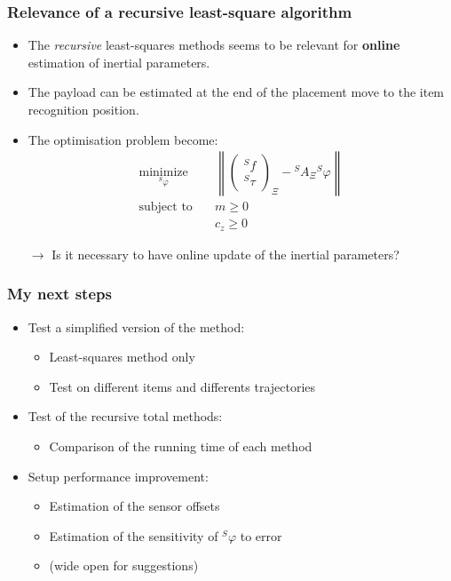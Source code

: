 \documentclass[usenames,dvipsnames]{beamer}
\newcommand{\norm}[1]{\left\lVert#1\right\rVert}
\begin{document}
\begin{frame}
 \frametitle{Relevance of a recursive least-square algorithm}

\begin{itemize}
  \item The \textit{recursive} least-squares methods seems to be relevant for \textbf{online} estimation of inertial parameters.
  \item The payload can be estimated at the end of the placement move to the item recognition position.
  \item The optimisation problem become:
  \begin{align*}
   \underset{{}^S \varphi}{\textrm{minimize}} \quad &
   \norm{ \begin{pmatrix}
   {}^S f    \\
   {}^S \tau
   \end{pmatrix}_{\Xi}
   - {}^S A_{\Xi} {}^S \varphi } \\
   \textrm{subject \ to} \quad & m \geq 0   \\
                               & c_z \geq 0
  \end{align*}
  \item [$\rightarrow$] \textcolor{RoyalPurple}{Is it necessary to have online update of the inertial parameters?}

\end{itemize}
\end{frame}


\begin{frame}
  \frametitle{My next steps}

  \begin{itemize}
    \item Test a simplified version of the method:
    \begin{itemize}
      \item Least-squares method only
      \item Test on different items and differents trajectories
    \end{itemize}
  \item Test of the recursive total methods:
  \begin{itemize}
    \item Comparison of the running time of each method
  \end{itemize}
  \item Setup performance improvement:
  \begin{itemize}
    \item Estimation of the sensor offsets
    \item Estimation of the sensitivity of ${}^S \varphi$ to error
    \item (wide open for suggestions)
  \end{itemize}
  \end{itemize}
\end{frame}
\end{document}
